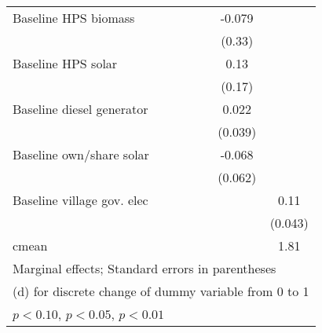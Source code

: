 \begin{table}[htbp]
\begin{tabular*}{1\hsize}{@{\hskip\tabcolsep\extracolsep\fill}l*{6}{c}}
Baseline HPS biomass&                  &                  &                  &                  &   -0.079         &                  \\
                &                  &                  &                  &                  &   (0.33)         &                  \\
Baseline HPS solar&                  &                  &                  &                  &     0.13         &                  \\
                &                  &                  &                  &                  &   (0.17)         &                  \\
Baseline diesel generator&                  &                  &                  &                  &    0.022         &                  \\
                &                  &                  &                  &                  &  (0.039)         &                  \\
Baseline own/share solar&                  &                  &                  &                  &   -0.068         &                  \\
                &                  &                  &                  &                  &  (0.062)         &                  \\
Baseline village gov. elec&                  &                  &                  &                  &                  &     0.11\sym{**} \\
                &                  &                  &                  &                  &                  &  (0.043)         \\
\midrule
cmean           &                  &                  &                  &                  &                  &     1.81         \\
\bottomrule
\multicolumn{7}{l}{\footnotesize Marginal effects; Standard errors in parentheses}\\
\multicolumn{7}{l}{\footnotesize  (d) for discrete change of dummy variable from 0 to 1}\\
\multicolumn{7}{l}{\footnotesize \sym{*} \(p<0.10\), \sym{**} \(p<0.05\), \sym{***} \(p<0.01\)}\\
\end{tabular*}
\end{table}
